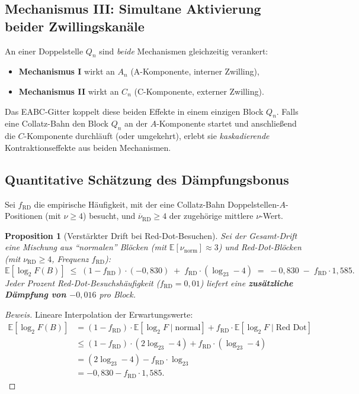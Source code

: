 \documentclass[12pt,a4paper]{article}
\newtheorem{proposition}[definition]{Proposition}
\newenvironment{beweis}{\begin{proof}[Beweis]}{\end{proof}}
\newcommand{\E}{\mathbb{E}}
\newcommand{\logt}{\log_2}
\begin{document}
\subsection{Mechanismus III: Simultane Aktivierung beider Zwillingskanäle}

\begin{tcolorbox}[kernidee, title={Doppelte Verstärkung an Doppelstellen}]
An einer Doppelstelle $Q_n$ sind \emph{beide} Mechanismen gleichzeitig verankert:
\begin{itemize}[leftmargin=2em]
  \item \textbf{Mechanismus I} wirkt an $A_n$ (A-Komponente, interner Zwilling),
  \item \textbf{Mechanismus II} wirkt an $C_n$ (C-Komponente, externer Zwilling).
\end{itemize}
Das EABC-Gitter koppelt diese beiden Effekte in einem einzigen Block $Q_n$.
Falls eine Collatz-Bahn den Block $Q_n$ an der $A$-Komponente startet und
anschließend die $C$-Komponente durchläuft (oder umgekehrt), erlebt sie
\emph{kaskadierende} Kontraktionseffekte aus beiden Mechanismen.
\end{tcolorbox}

\subsection{Quantitative Schätzung des Dämpfungsbonus}

Sei $f_{\mathrm{RD}}$ die empirische Häufigkeit, mit der eine Collatz-Bahn
Doppelstellen-$A$-Positionen (mit $\nu \geq 4$) besucht, und
$\overline{\nu}_{\mathrm{RD}} \geq 4$ der zugehörige mittlere $\nu$-Wert.

\begin{proposition}[Verstärkter Drift bei Red-Dot-Besuchen]
\label{prop:verstärkter_drift}
Sei der Gesamt-Drift eine Mischung aus ``normalen'' Blöcken (mit
$\E[\nu_{\mathrm{norm}}] \approx 3$) und Red-Dot-Blöcken (mit
$\nu_{\mathrm{RD}} \geq 4$, Frequenz $f_{\mathrm{RD}}$):
\[
  \E[\logt F(B)]
  \;\leq\;
  (1 - f_{\mathrm{RD}}) \cdot (-0{,}830)
  \;+\;
  f_{\mathrm{RD}} \cdot (\logt 3 - 4)
  \;=\;
  -0{,}830 \;-\; f_{\mathrm{RD}} \cdot 1{,}585.
\]
Jeder Prozent Red-Dot-Besuchshäufigkeit ($f_{\mathrm{RD}} = 0{,}01$)
liefert eine \textbf{zusätzliche Dämpfung von $-0{,}016$} pro Block.
\end{proposition}

\begin{beweis}
Lineare Interpolation der Erwartungswerte:
\begin{align*}
  \E[\logt F(B)]
  &= (1-f_{\mathrm{RD}}) \cdot \E[\logt F \mid \text{normal}]
    + f_{\mathrm{RD}} \cdot \E[\logt F \mid \text{Red Dot}] \\
  &\leq (1-f_{\mathrm{RD}}) \cdot (2\logt 3 - 4)
    + f_{\mathrm{RD}} \cdot (\logt 3 - 4) \\
  &= (2\logt 3 - 4) - f_{\mathrm{RD}} \cdot \logt 3 \\
  &= -0{,}830 - f_{\mathrm{RD}} \cdot 1{,}585.
\end{align*}
\end{beweis}
\end{document}
